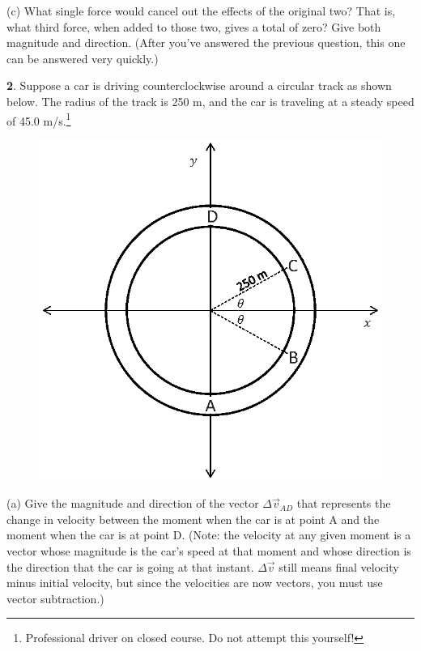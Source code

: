 (c) What single force would cancel out the effects of the original two?  That
is, what third force, when added to those two, gives a total of zero?
Give both magnitude and direction.  (After you've answered the
previous question, this one can be answered very quickly.)

\vfil\eject


{\bf 2}.  Suppose a car is driving counterclockwise around a circular track as shown
below.  The radius of the track is 250 m, and the car is traveling
at a steady speed of 45.0 m/s.\footnote{Professional driver on closed
course.  Do not attempt this yourself!}

\begin{figure}[h]
\centerline{\includegraphics{vectors/vectors_fig_new.eps}}
\end{figure}

(a) Give the magnitude and direction of the vector $\Delta{\vec v}_{AD}$
that represents the change in velocity between the moment when the
car is at point A and the moment when the car is at point D.  (Note:
the velocity at any given moment is a vector whose magnitude is the
car's speed at that moment and whose direction is the direction that
the car is going at that instant.  $\Delta{\vec v}$ still means
final velocity minus initial velocity, but since the velocities are
now vectors, you must use vector subtraction.)

